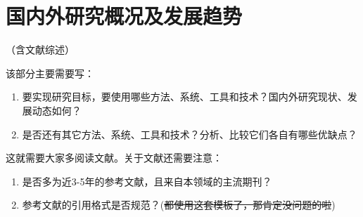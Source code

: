 %
%
%
%

\section{国内外研究概况及发展趋势}

（含文献综述）

该部分主要需要写：
\begin{enumerate}[label=\arabic*)]
    \item 要实现研究目标，要使用哪些方法、系统、工具和技术？国内外研究现状、发展动态如何？
    \item 是否还有其它方法、系统、工具和技术？分析、比较它们各自有哪些优缺点？
\end{enumerate}
这就需要大家多阅读文献。关于文献还需要注意：
\begin{enumerate}[label=\arabic*)]
    \item 是否多为近3-5年的参考文献，且来自本领域的主流期刊？
    \item 参考文献的引用格式是否规范？(\sout{都使用这套模板了，那肯定没问题的啦})
\end{enumerate}
